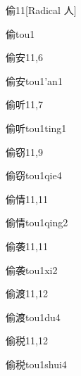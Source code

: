 \begin{entry}{偷}{11}[Radical 人]
  \begin{phonetics}{偷}{tou1}
  \end{phonetics}
\end{entry}

\begin{entry}{偷安}{11,6}
  \begin{phonetics}{偷安}{tou1'an1}
  \end{phonetics}
\end{entry}

\begin{entry}{偷听}{11,7}
  \begin{phonetics}{偷听}{tou1ting1}
  \end{phonetics}
\end{entry}

\begin{entry}{偷窃}{11,9}
  \begin{phonetics}{偷窃}{tou1qie4}
  \end{phonetics}
\end{entry}

\begin{entry}{偷情}{11,11}
  \begin{phonetics}{偷情}{tou1qing2}
  \end{phonetics}
\end{entry}

\begin{entry}{偷袭}{11,11}
  \begin{phonetics}{偷袭}{tou1xi2}
  \end{phonetics}
\end{entry}

\begin{entry}{偷渡}{11,12}
  \begin{phonetics}{偷渡}{tou1du4}
  \end{phonetics}
\end{entry}

\begin{entry}{偷税}{11,12}
  \begin{phonetics}{偷税}{tou1shui4}
  \end{phonetics}
\end{entry}

